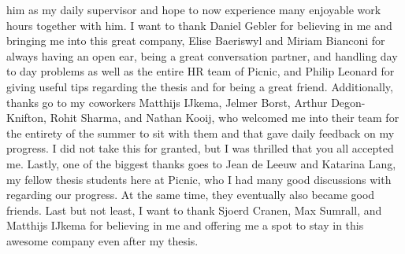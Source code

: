 him as my daily supervisor and hope to now experience many enjoyable work hours
together with him. I want to thank Daniel Gebler for believing in me and
bringing me into this great company, Elise Baeriswyl and Miriam Bianconi
for always having an open ear, being a great conversation partner,
and handling day to day problems as well as the entire HR team of Picnic,
and Philip Leonard for giving useful tips regarding the thesis and for being
a great friend.
Additionally, thanks go to my coworkers Matthijs IJkema, Jelmer Borst,
Arthur Degon-Knifton, Rohit Sharma, and Nathan Kooij, who welcomed me into their
team for the entirety of the summer to sit with them and that gave daily
feedback on my progress.
I did not take this for granted, but I was thrilled that you all accepted me.
Lastly, one of the biggest thanks goes to Jean de Leeuw and Katarina Lang,
my fellow thesis students here at Picnic, who I had many good discussions with
regarding our progress. At the same time, they eventually also became good
friends. Last but not least, I want to thank Sjoerd Cranen, Max Sumrall,
and Matthijs IJkema for believing in me and offering me a spot to stay in this
awesome company even after my thesis.

\vfill

\cleardoublepage

\raggedbottom
